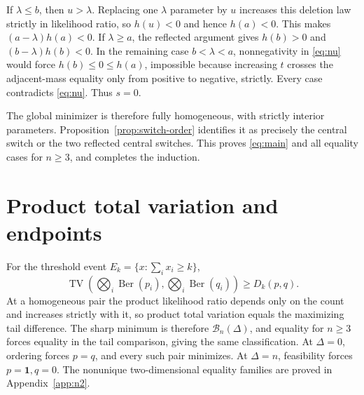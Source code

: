 \documentclass[11pt]{article}
\numberwithin{equation}{section}
\theoremstyle{remark}\newtheorem{remark}[theorem]{Remark}
\DeclareMathOperator{\Ber}{Ber}
\DeclareMathOperator{\TV}{TV}
\newcommand{\one}{\mathbf 1}
\newcommand{\Bcal}{\mathcal B}
\begin{document}
If $\lambda\le b$, then $u>\lambda$. Replacing one $\lambda$
parameter by $u$ increases this deletion law strictly in likelihood
ratio, so $h(u)<0$ and hence $h(a)<0$. This makes
$(a-\lambda)h(a)<0$. If $\lambda\ge a$, the reflected argument gives
$h(b)>0$ and $(b-\lambda)h(b)<0$. In the remaining case
$b<\lambda<a$, nonnegativity in \eqref{eq:nu} would force
$h(b)\le0\le h(a)$, impossible because increasing $t$ crosses the
adjacent-mass equality only from positive to negative, strictly.
Every case contradicts \eqref{eq:nu}. Thus $s=0$.

The global minimizer is therefore fully homogeneous, with strictly
interior parameters. Proposition~\ref{prop:switch-order} identifies it
as precisely the central switch or the two reflected central switches.
This proves \eqref{eq:main} and all equality cases for $n\ge3$, and
completes the induction.

\section{Product total variation and endpoints}
For the threshold event $E_k=\{x:\sum_i x_i\ge k\}$,
\[
 \TV\left(\bigotimes_i\Ber(p_i),\bigotimes_i\Ber(q_i)\right)
 \ge D_k(p,q).
\]
At a homogeneous pair the product likelihood ratio depends only on
the count and increases strictly with it, so product total variation
equals the maximizing tail difference. The sharp minimum is therefore
$\Bcal_n(\Delta)$, and equality for $n\ge3$ forces equality in the tail
comparison, giving the same classification.
At $\Delta=0$, ordering forces $p=q$, and every such pair minimizes.
At $\Delta=n$, feasibility forces $p=\one,q=0$.
The nonunique two-dimensional equality families are proved in
Appendix~\ref{app:n2}.

\appendix
\end{document}
